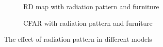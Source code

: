 \documentclass[12pt,DIV14,BCOR12mm,a4paper,footinclude=false,headinclude,parskip=half-,twoside,openright,cleardoublepage=empty,toc=index,bibliography=totoc,listof=totoc]{scrreprt}
\numberwithin{equation}{chapter}
\begin{document}
\begin{figure}[t]
\begin{subfigure}{0.45\textwidth}
            \centering
            \caption{RD map with radiation pattern and furniture}
        \end{subfigure}\hspace{0.5cm}
        \begin{subfigure}{0.45\textwidth}
            \centering
            \caption{CFAR with radiation pattern and furniture}
        \end{subfigure}
        \caption{The effect of radiation pattern in different models}
        \label{the effect of beampattern in different models}
\end{figure}
\end{document}
